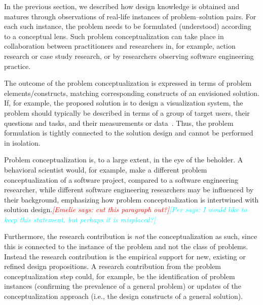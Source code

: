 \documentclass[graybox]{svmult}
\newcommand{\emelie}[1]{\textcolor{red}{{\it [Emelie says: #1]}}}
\newcommand{\per}[1]{\textcolor{cyan}{{\it [Per says: #1]}}}
\newcommand{\emelie}[1]{}
\newcommand{\per}[1]{}
\begin{document}
 In the previous section, we described how design knowledge is obtained and matures through observations of real-life instances of problem--solution pairs. For each such instance, the problem needs to be formulated (understood) according to a conceptual lens. Such problem conceptualization can take place in collaboration between practitioners and researchers in, for example, action research or case study research, or by researchers observing software engineering practice.


The outcome of the problem conceptualization is expressed in terms of problem elements/constructs, matching corresponding constructs of an envisioned solution. If, for example, the proposed solution is to design a visualization system, the problem should typically be described in terms of a group of target users, their questions and tasks, and their measurements or data~\cite{meyer_nested_2015}. Thus, the problem formulation is tightly connected to the solution design and cannot be performed in isolation. 

Problem conceptualization is, to a large extent, in the eye of the beholder. A behavioral scientist would, for example, make a different problem conceptualization of a software project, compared to a software engineering researcher, while different software engineering researchers may be influenced by their background, emphasizing how problem conceptualization is intertwined with solution design.\emelie{cut this paragraph out?}\per{I would like to keep this statement, but perhaps it is misplaced?}


Furthermore, the research contribution is \emph{not} the conceptualization as such, since this is connected to the instance of the problem and not the class of problems. Instead the research contribution is the empirical support for new, existing or refined design propositions. A research contribution from the problem conceptualization step could, for example, be the identification of problem instances (confirming the prevalence of a general problem) or updates of the conceptualization approach (i.e., the design constructs of a general solution).
\end{document}
